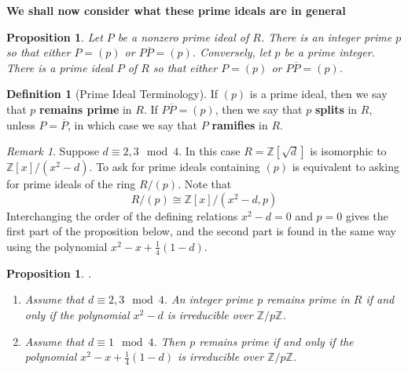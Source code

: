 \documentclass[12pt]{article}
\newtheorem{prop}[thm]{Proposition}
\theoremstyle{definition}
\newtheorem{defn}[thm]{Definition}
\theoremstyle{remark}
\newtheorem{rmk}[thm]{Remark}
\numberwithin{equation}{section}
\newcommand\Z{\mathbb Z}    %
\newcommand\B[1]{\textbf{ #1}}
\begin{document}
\vspace{15pt}

\textbf{We shall now consider what these prime ideals are in general}

\vspace{15pt}

\begin{prop}
        Let $P$ be a nonzero prime ideal of $R$. There is an integer prime $p$ so that either $P = (p)$ or $P\overline{P} = (p)$. Conversely, let $p$ be a prime integer. There is a prime ideal $P$ of $R$ so that either $P = (p)$ or $P\overline{P}= (p)$.
\end{prop}

\vspace{15pt}

\begin{defn}[Prime Ideal Terminology]
        If $(p)$ is a prime ideal, then we say that $p$ \B{remains prime} in $R$. If $P\overline{P} = (p)$, then we say that $p$ \B{splits} in $R$, unless $P = \overline{P}$, in which case we say that $P$ \B{ramifies} in $R$.
\end{defn}

\vspace{15pt}

\begin{rmk}
        Suppose $d \equiv 2,3\mod 4$. In this case $R = \Z[\sqrt{d}]$ is isomorphic to $\Z[x]/(x^2-d)$. To ask for prime ideals containing $(p)$ is equivalent to asking for prime ideals of the ring $R/(p)$. Note that \begin{equation}
                R/(p) \cong \Z[x]/(x^2-d,p)
        \end{equation}
        Interchanging the order of the defining relations $x^2-d=0$ and $p=0$ gives the first part of the proposition below, and the second part is found in the same way using the polynomial $x^2 -x+\frac{1}{4}(1-d)$.
\end{rmk}

\vspace{15pt}

\begin{prop}
        .\newline \begin{enumerate}
                \item Assume that $d \equiv 2,3 \mod 4$. An integer prime $p$ remains prime in $R$ if and only if the polynomial $x^2-d$ is irreducible over $\Z/p\Z$.
                \item Assume that $d\equiv 1 \mod 4$. Then $p$ remains prime if and only if the polynomial $x^2 -x+\frac{1}{4}(1-d)$ is irreducible over $\Z/p\Z$.
        \end{enumerate}
\end{prop}
\end{document}
